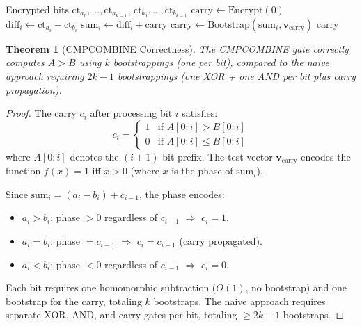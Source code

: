 \documentclass[11pt,a4paper]{article}
\newtheorem{theorem}{Theorem}[section]
\begin{document}
\begin{algorithm}[H]
\caption{CMPCOMBINE --- Multi-Bit Comparison in One Pass}
\label{alg:cmpcombine}
\begin{algorithmic}[1]
\Require Encrypted bits $\text{ct}_{a_0}, \ldots, \text{ct}_{a_{k-1}}$, $\text{ct}_{b_0}, \ldots, \text{ct}_{b_{k-1}}$
\State $\text{carry} \gets \text{Encrypt}(0)$ 
 
    \State $\text{diff}_i \gets \text{ct}_{a_i} - \text{ct}_{b_i}$ 
    \State $\text{sum}_i \gets \text{diff}_i + \text{carry}$
    \State {}
    \State $\text{carry} \gets \text{Bootstrap}(\text{sum}_i, \mathbf{v}_{\text{carry}})$
\EndFor
\State \Return $\text{carry}$ 
\end{algorithmic}
\end{algorithm}

\begin{theorem}[CMPCOMBINE Correctness]
\label{thm:cmpcombine}
The CMPCOMBINE gate correctly computes $A > B$ using $k$ bootstrappings (one per bit),
compared to the naive approach requiring $2k - 1$ bootstrappings (one XOR + one AND
per bit plus carry propagation).
\end{theorem}

\begin{proof}
The carry $c_i$ after processing bit $i$ satisfies:
\[
c_i = \begin{cases}
1 & \text{if } A[0:i] > B[0:i] \\
0 & \text{if } A[0:i] \leq B[0:i]
\end{cases}
\]
where $A[0:i]$ denotes the $(i+1)$-bit prefix. The test vector $\mathbf{v}_{\text{carry}}$
encodes the function $f(x) = 1$ iff $x > 0$ (where $x$ is the phase of $\text{sum}_i$).

Since $\text{sum}_i = (a_i - b_i) + c_{i-1}$, the phase encodes:
\begin{itemize}[nosep]
\item $a_i > b_i$: phase $> 0$ regardless of $c_{i-1}$ $\Rightarrow$ $c_i = 1$.
\item $a_i = b_i$: phase $= c_{i-1}$ $\Rightarrow$ $c_i = c_{i-1}$ (carry propagated).
\item $a_i < b_i$: phase $< 0$ regardless of $c_{i-1}$ $\Rightarrow$ $c_i = 0$.
\end{itemize}

Each bit requires one homomorphic subtraction ($O(1)$, no bootstrap) and one bootstrap
for the carry, totaling $k$ bootstraps. The naive approach requires separate XOR, AND,
and carry gates per bit, totaling $\geq 2k - 1$ bootstraps.
\end{proof}
\end{document}
